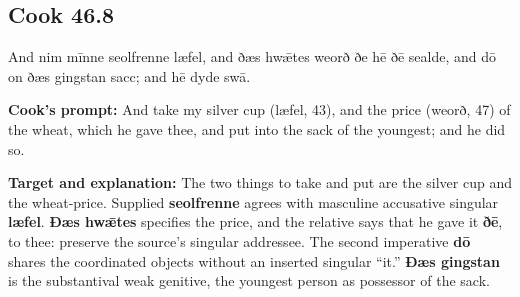 \par\begin{minipage}{\linewidth}\raggedright
\subsection*{Cook 46.8}

And nim mīnne seolfrenne læfel, and ðæs hwǣtes weorð ðe hē ðē sealde, and dō on ðæs gingstan sacc; and hē dyde swā.

\textbf{Cook’s prompt:} And take my silver cup (læfel, 43), and the price (weorð, 47) of the wheat, which he gave thee, and put into the sack of the youngest; and he did so.

\textbf{Target and explanation:} The two things to take and put are the silver cup and the wheat-price. Supplied \textbf{seolfrenne} agrees with masculine accusative singular \textbf{læfel}. \textbf{Ðæs hwǣtes} specifies the price, and the relative says that he gave it \textbf{ðē}, to thee: preserve the source’s singular addressee. The second imperative \textbf{dō} shares the coordinated objects without an inserted singular “it.” \textbf{Ðæs gingstan} is the substantival weak genitive, the youngest person as possessor of the sack.

\end{minipage}\par\addvspace{4pt}

